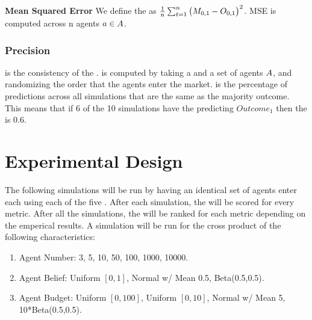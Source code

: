 \textbf{Mean Squared Error}
We define the  as $\frac{1}{n}\sum_{t=1}^{n} \big(M_{0,1} - O_{0,1}\big)^2$. MSE
is computed across n agents $a\in A$. 

\subsubsection{Precision}
 is the consistency of the .  is computed by taking a 
and a set of agents $A$, and randomizing the order that the agents enter the market.  is the
percentage of predictions across all simulations that are the same as the majority outcome. This means that if 6 of
the 10 simulations have the  predicting $Outcome_{1}$ then the  is 0.6.

\section{Experimental Design}
The following simulations will be run by having an identical set of agents enter each  using each
of the five . After each simulation, the  will be scored for every
metric. After all the simulations, the  will be ranked for each metric depending on the emperical
results. A simulation will be run for the cross product of the following characteristics:
\begin{enumerate}
  \item Agent Number: 3, 5, 10, 50, 100, 1000, 10000.
  \item Agent Belief: Uniform $[0,1]$, Normal w/ Mean 0.5, Beta(0.5,0.5).
  \item Agent Budget: Uniform $[0,100]$, Uniform $[0,10]$, Normal w/ Mean 5, 10*Beta(0.5,0.5).
\end{enumerate}
\fi